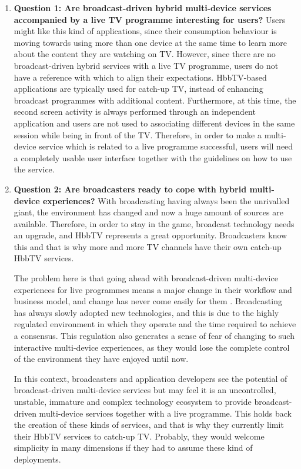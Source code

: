 \begin{enumerate}
	\item \textbf{Question 1: Are broadcast-driven hybrid multi-device services accompanied by a live TV programme interesting for users?} Users might like this kind of applications, since their consumption behaviour is moving towards using more than one device at the same time to learn more about the content they are watching on TV. However, since there are no broadcast-driven hybrid services with a live TV programme, users do not have a reference with which to align their expectations. HbbTV-based applications are typically used for catch-up TV, instead of enhancing broadcast programmes with additional content. Furthermore, at this time, the second screen activity is always performed through an independent application and users are not used to associating different devices in the same session while being in front of the TV. Therefore, in order to make a multi-device service which is related to a live programme successful, users will need a completely usable user interface together with the guidelines on how to use the service.
	\item \textbf{Question 2: Are broadcasters ready to cope with hybrid multi-device experiences?} With broadcasting having always been the unrivalled giant, the environment has changed and now a huge amount of sources are available. Therefore, in order to stay in the game, broadcast technology needs an upgrade, and HbbTV represents a great opportunity. Broadcasters know this and that is why more and more TV channels have their own catch-up HbbTV services.
	
	The problem here is that going ahead with broadcast-driven multi-device experiences for live programmes means a major change in their workflow and business model, and change has never come easily for them \cite{Claudy2012}. Broadcasting has always slowly adopted new technologies, and this is due to the highly regulated environment in which they operate and the time required to achieve a consensus. This regulation also generates a sense of fear of changing to such interactive multi-device experiences, as they would lose the complete control of the environment they have enjoyed until now.
	
	In this context, broadcasters and application developers see the potential of broadcast-driven multi-device services but may feel it is an uncontrolled, unstable, immature and complex technology ecosystem to provide broadcast-driven multi-device services together with a live programme. This holds back the creation of these kinds of services, and that is why they currently limit their HbbTV services to catch-up TV. Probably, they would welcome simplicity in many dimensions if they had to assume these kind of deployments.  
	

\end{enumerate}
